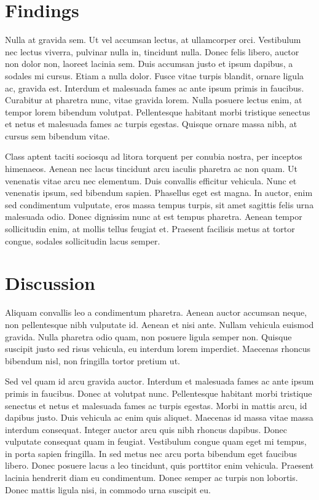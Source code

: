 \documentclass[11pt, onecolumn]{article}
\begin{document}
\section{Findings}
Nulla at gravida sem. Ut vel accumsan lectus, at ullamcorper orci. Vestibulum nec lectus viverra, pulvinar nulla in, tincidunt nulla. Donec felis libero, auctor non dolor non, laoreet lacinia sem. Duis accumsan justo et ipsum dapibus, a sodales mi cursus. Etiam a nulla dolor. Fusce vitae turpis blandit, ornare ligula ac, gravida est. Interdum et malesuada fames ac ante ipsum primis in faucibus. Curabitur at pharetra nunc, vitae gravida lorem. Nulla posuere lectus enim, at tempor lorem bibendum volutpat. Pellentesque habitant morbi tristique senectus et netus et malesuada fames ac turpis egestas. Quisque ornare massa nibh, at cursus sem bibendum vitae.

Class aptent taciti sociosqu ad litora torquent per conubia nostra, per inceptos himenaeos. Aenean nec lacus tincidunt arcu iaculis pharetra ac non quam. Ut venenatis vitae arcu nec elementum. Duis convallis efficitur vehicula. Nunc et venenatis ipsum, sed bibendum sapien. Phasellus eget est magna. In auctor, enim sed condimentum vulputate, eros massa tempus turpis, sit amet sagittis felis urna malesuada odio. Donec dignissim nunc at est tempus pharetra. Aenean tempor sollicitudin enim, at mollis tellus feugiat et. Praesent facilisis metus at tortor congue, sodales sollicitudin lacus semper.

\section{Discussion}
Aliquam convallis leo a condimentum pharetra. Aenean auctor accumsan neque, non pellentesque nibh vulputate id. Aenean et nisi ante. Nullam vehicula euismod gravida. Nulla pharetra odio quam, non posuere ligula semper non. Quisque suscipit justo sed risus vehicula, eu interdum lorem imperdiet. Maecenas rhoncus bibendum nisl, non fringilla tortor pretium ut.

Sed vel quam id arcu gravida auctor. Interdum et malesuada fames ac ante ipsum primis in faucibus. Donec at volutpat nunc. Pellentesque habitant morbi tristique senectus et netus et malesuada fames ac turpis egestas. Morbi in mattis arcu, id dapibus justo. Duis vehicula ac enim quis aliquet. Maecenas id massa vitae massa interdum consequat. Integer auctor arcu quis nibh rhoncus dapibus. Donec vulputate consequat quam in feugiat. Vestibulum congue quam eget mi tempus, in porta sapien fringilla. In sed metus nec arcu porta bibendum eget faucibus libero. Donec posuere lacus a leo tincidunt, quis porttitor enim vehicula. Praesent lacinia hendrerit diam eu condimentum. Donec semper ac turpis non lobortis. Donec mattis ligula nisi, in commodo urna suscipit eu.
\end{document}
